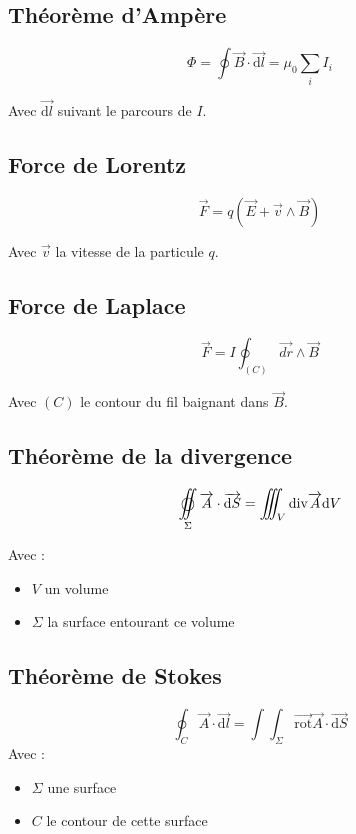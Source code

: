 \documentclass[a4paper, 11pt]{article}
\newcommand{\ve}{\overrightarrow}
\newcommand{\fint}{%
        \setbox0=\hbox{$\displaystyle \int\!\!\!\!\!\int$}
        \setbox1=\hbox to \wd0{\hfill$\bigcirc$\hfill}
        \setbox0=\hbox to \wd0{\copy0\hss\copy1}
        \mathop{\copy0}
    }
\newcommand{\tint}{\int\!\!\!\!\!\int\!\!\!\!\!\int}
\newcommand{\dint}{\int\!\!\!\!\!\int}
\newcommand{\dv}{\mathrm{div}}
\begin{document}
    \subsection{Théorème d'Ampère}

    $$\Phi = \oint\ve{B}\cdot\ve{\mathrm{d}l} = \mu_0\sum_iI_i$$

    Avec $\ve{\mathrm{d}l}$ suivant le parcours de $I$.

    \subsection{Force de Lorentz}

    $$\ve{F} = q\left(\ve{E}+\ve{v}\wedge\ve{B}\right)$$

    Avec $\ve{v}$ la vitesse de la particule $q$.

    \subsection{Force de Laplace}

    $$\ve{F} = I\oint_{(C)}\ve{dr}\wedge\ve{B}$$

    Avec $(C)$ le contour du fil baignant dans $\ve{B}$.

    \subsection{Théorème de la divergence}

    $$\fint_\Sigma\ve{A}\cdot\ve{\mathrm{d}S} = \tint_V\dv\ve{A}\mathrm{d}V$$

    Avec :
    \begin{itemize}
        \item $V$ un volume
        \item $\Sigma$ la surface entourant ce volume
    \end{itemize}

    \subsection{Théorème de Stokes}

    $$\oint_C\ve{A}\cdot\ve{\mathrm{d}l} = \dint_{\Sigma}\ve{\mathrm{rot}}\ve{A}\cdot\ve{\mathrm{d}S}$$
    Avec :
    \begin{itemize}
        \item $\Sigma$ une surface
        \item $C$ le contour de cette surface
    \end{itemize}
\end{document}
